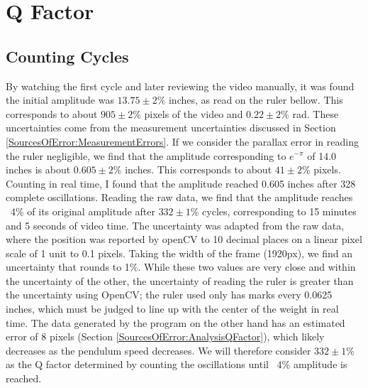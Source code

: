 \documentclass[11pt]{article}
\begin{document}
    \section{Q Factor}
        \subsection{Counting Cycles}
            By watching the first cycle and later reviewing the video manually, it was found the initial amplitude was  $13.75 \pm 2\%$ inches, as read on the ruler bellow. This corresponds to about $905 \pm 2\%$ pixels of the video and $0.22 \pm 2\%$ rad. These uncertainties come from the measurement uncertainties discussed in Section \ref{SourcesOfError:MeasurementErrors}. If we consider the parallax error in reading the ruler negligible, we find that the amplitude corresponding to $e^{-\pi}$ of 14.0 inches is about $0.605 \pm 2\%$ inches. This corresponds to about $41 \pm 2\%$ pixels. Counting in real time, I found that the amplitude reached 0.605 inches after 328 complete oscillations. Reading the raw data, we find that the amplitude reaches ~4\% of its original amplitude after $332 \pm 1\%$ cycles, corresponding to 15 minutes and 5 seconds of video time. The uncertainty was adapted from the raw data, where the position was reported by openCV to 10 decimal places on a linear pixel scale of 1 unit to 0.1 pixels. Taking the width of the frame (1920px), we find an uncertainty that rounds to 1\%. While these two values are very close and within the uncertainty of the other, the uncertainty of reading the ruler is greater than the uncertainty using OpenCV; the ruler used only has marks every 0.0625 inches, which must be judged to line up with the center of the weight in real time. The data generated by the program on the other hand has an estimated error of 8 pixels (Section \ref{SourcesOfError:AnalysisQFactor}), which likely decreases as the pendulum speed decreases. We will therefore consider $332 \pm 1\%$ as the Q factor determined by counting the oscillations until ~4\% amplitude is reached. 
        
\end{document}
